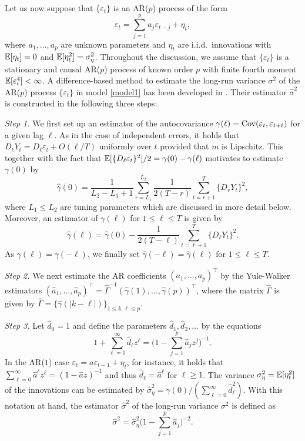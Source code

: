 \documentclass[a4paper,12pt]{article}
\numberwithin{equation}{section}
\begin{document}
Let us now suppose that $\{\varepsilon_t\}$ is an AR($p$) process of the form
\[ \varepsilon_t = \sum\limits_{j=1}^p a_j \varepsilon_{t-j} + \eta_t, \]
where $a_1,\ldots,a_p$ are unknown parameters and $\eta_t$ are i.i.d.\ innovations with $\mathbb{E}[\eta_t] = 0$ and $\mathbb{E}[\eta_t^2] = \sigma_\eta^2$. Throughout the discussion, we assume that $\{\varepsilon_t\}$ is a stationary and causal AR($p$) process of known order $p$ with finite fourth moment $\mathbb{E}[\varepsilon_t^4] < \infty$. A difference-based method to estimate the long-run variance $\sigma^2$ of the AR($p$) process $\{\varepsilon_t\}$ in model \eqref{model1} has been developed in \cite{Hall2003}. Their estimator $\widehat{\sigma}^2$ is constructed in the following three steps: 
\vspace{10pt}


\textit{Step 1.} We first set up an estimator of the autocovariance $\gamma(\ell) = \textnormal{Cov}(\varepsilon_t,\varepsilon_{t+\ell})$ for a given lag $\ell$. As in the case of independent errors, it holds that $D_\ell Y_t = D_\ell \varepsilon_t + O(\ell/T)$ uniformly over $t$ provided that $m$ is Lipschitz. This together with the fact that $\mathbb{E}[ \{  D_\ell \varepsilon_t \}^2 ] / 2 = \gamma(0) - \gamma(\ell)$ motivates to estimate $\gamma(0)$ by 
\[ \widehat{\gamma}(0) = \frac{1}{L_2-L_1+1}\sum_{r=L_1}^{L_2}\frac{1}{2(T-r)}\sum_{t=r+1}^T\{D_rY_t\}^2, \]
where $L_1\le L_2$ are tuning parameters which are discussed in more detail below. Moreover, an estimator of $\gamma(\ell)$ for $1 \le \ell \le T$ is given by 
\[ \widehat{\gamma}(\ell) = \widehat{\gamma}(0) - \frac{1}{2(T-\ell)}\sum_{t=\ell+1}^T \{D_\ell Y_t\}^2. \]
As $\gamma(\ell) = \gamma(-\ell)$, we finally set $\widehat{\gamma}(-\ell) = \widehat{\gamma}(\ell)$ for $1 \le \ell \le T$. 
\vspace{10pt}

\textit{Step 2.} We next estimate the AR coefficients $(a_1,\ldots,a_p)^\top$ by the Yule-Walker estimators $(\widehat{a}_1,\ldots,\widehat{a}_p)^\top = \widehat{\Gamma}^{-1} (\widehat{\gamma}(1), \ldots, \widehat{\gamma}(p))^\top$, where the matrix $\widehat{\Gamma}$ is given by $\widehat{\Gamma} = \{ \widehat{\gamma}(|k-\ell|) \}_{1 \le k,\ell \le p}$. 
\vspace{10pt}

\textit{Step 3.} Let $\widehat{d}_0 = 1$ and define the parameters $\widehat{d}_1, \widehat{d}_2, \ldots$ by the equations  
\[ 1 + \sum_{\ell=1}^\infty \widehat{d}_\ell z^\ell = \Big(1 - \sum_{j=1}^p \widehat{a}_j z^j \Big)^{-1}. \]
In the AR($1$) case $\varepsilon_t = a \varepsilon_{t-1} + \eta_t$, for instance, it holds that $\sum_{\ell = 0}^\infty \widehat{a}^\ell z^\ell = (1 - \widehat{a}z)^{-1}$ and thus $\widehat{d}_\ell = \widehat{a}^\ell$ for $\ell \ge 1$. The variance $\sigma_\eta^2 = \mathbb{E}[\eta_t^2]$ of the innovations can be estimated by $\widehat{\sigma}_\eta^2 = \widehat{\gamma}(0) / (\sum_{\ell=0}^\infty \widehat{d}_\ell^2)$. With this notation at hand, the estimator $\widehat{\sigma}^2$ of the long-run variance $\sigma^2$ is defined as 
\[\widehat{\sigma}^2 = \widehat{\sigma}^2_\eta \Big( 1-\sum_{j=1}^p \widehat{a}_j\Big)^{-2}.\]
\vspace{3pt}
\end{document}
